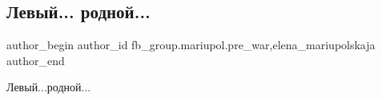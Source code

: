  
 
 
 
 

\subsection{Левый... родной...}
\label{sec:27_01_2023.fb.fb_group.mariupol.pre_war.3.levii__rodnoi_}
 
\ifcmt
 author_begin
   author_id fb_group.mariupol.pre_war,elena_mariupolskaja
 author_end
\fi

Левый...родной...
